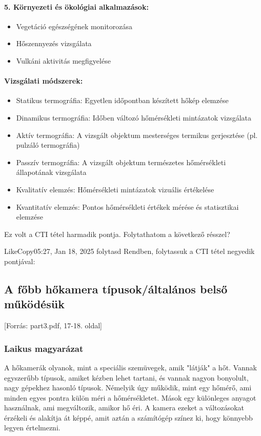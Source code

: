 \documentclass[a4paper,12pt]{article}
\begin{document}
\paragraph{5. Környezeti és ökológiai alkalmazások:} \begin{itemize} \item Vegetáció egészségének monitorozása \item Hőszennyezés vizsgálata \item Vulkáni aktivitás megfigyelése \end{itemize}

\paragraph{Vizsgálati módszerek:} \begin{itemize} \item Statikus termográfia: Egyetlen időpontban készített hőkép elemzése \item Dinamikus termográfia: Időben változó hőmérsékleti mintázatok vizsgálata \item Aktív termográfia: A vizsgált objektum mesterséges termikus gerjesztése (pl. pulzáló termográfia) \item Passzív termográfia: A vizsgált objektum természetes hőmérsékleti állapotának vizsgálata \item Kvalitatív elemzés: Hőmérsékleti mintázatok vizuális értékelése \item Kvantitatív elemzés: Pontos hőmérsékleti értékek mérése és statisztikai elemzése \end{itemize}

Ez volt a CTI tétel harmadik pontja. Folytathatom a következő résszel?

LikeCopy05:27, Jan 18, 2025
folytasd
Rendben, folytassuk a CTI tétel negyedik pontjával:

\subsection{A főbb hőkamera típusok/általános belső működésük} [Forrás: part3.pdf, 17-18. oldal]

\subsubsection{Laikus magyarázat} A hőkamerák olyanok, mint a speciális szemüvegek, amik "látják" a hőt. Vannak egyszerűbb típusok, amiket kézben lehet tartani, és vannak nagyon bonyolult, nagy gépekhez hasonló típusok. Némelyik úgy működik, mint egy hőmérő, ami minden egyes pontra külön méri a hőmérsékletet. Mások egy különleges anyagot használnak, ami megváltozik, amikor hő éri. A kamera ezeket a változásokat érzékeli és alakítja át képpé, amit aztán a számítógép színez ki, hogy könnyebb legyen értelmezni.
\end{document}
